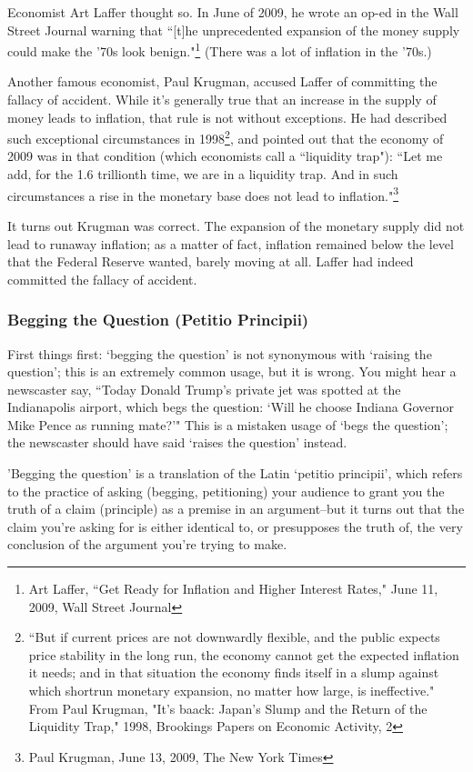 Economist Art Laffer thought so. In June of 2009, he wrote an op-ed in the Wall Street Journal
warning that ``[t]he unprecedented expansion of the money supply could make the '70s look
benign."\footnote{Art Laffer, ``Get Ready for Inflation and Higher Interest Rates," June 11, 2009, Wall Street Journal}
(There was a lot of inflation in the '70s.)

Another famous economist, Paul Krugman, accused Laffer of committing the fallacy of accident.
While it's generally true that an increase in the supply of money leads to inflation, that rule is not
without exceptions. He had described such exceptional circumstances in 
1998\footnote{``But if current prices are not downwardly flexible, and the public expects price stability in the long run, the economy
cannot get the expected inflation it needs; and in that situation the economy finds itself in a slump against which shortrun monetary expansion, no matter how large, is ineffective." From Paul Krugman, "It's baack: Japan's Slump and the
Return of the Liquidity Trap," 1998, Brookings Papers on Economic Activity, 2}, 
and pointed out
that the economy of 2009 was in that condition (which economists call a ``liquidity trap"): ``Let me
add, for the 1.6 trillionth time, we are in a liquidity trap. And in such circumstances a rise in the
monetary base does not lead to 
inflation."\footnote{Paul Krugman, June 13, 2009, The New York Times}

It turns out Krugman was correct. The expansion of the monetary supply did not lead to runaway
inflation; as a matter of fact, inflation remained below the level that the Federal Reserve wanted,
barely moving at all. Laffer had indeed committed the fallacy of accident.

\subsubsection{Begging the Question (Petitio Principii)}
First things first: `begging the question' is not synonymous with `raising the question'; this is an
extremely common usage, but it is wrong. You might hear a newscaster say, ``Today Donald
Trump's private jet was spotted at the Indianapolis airport, which begs the question: `Will he
choose Indiana Governor Mike Pence as running mate?'" This is a mistaken usage of `begs the
question'; the newscaster should have said `raises the question' instead.

'Begging the question' is a translation of the Latin `petitio principii', which refers to the practice
of asking (begging, petitioning) your audience to grant you the truth of a claim (principle) as a
premise in an argument--but it turns out that the claim you're asking for is either identical to, or
presupposes the truth of, the very conclusion of the argument you're trying to make.

